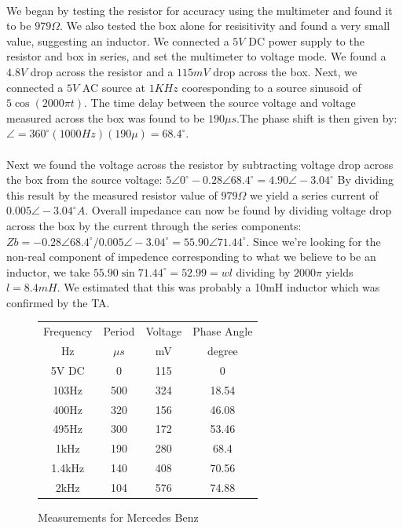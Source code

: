 \documentclass{article}
\begin{document}
\paragraph{}
We began by testing the resistor for accuracy using the multimeter and found
it to be $979\Omega{}$. We also tested the box alone for resisitivity and found
a very small value, suggesting an inductor. We connected a $5V$ DC power supply
to the resistor and box in series, and set the multimeter to voltage mode. We
found a $4.8V$ drop across the resistor and a $115mV$ drop across the box. Next,
we connected a $5V$ AC source at $1KHz$ cooresponding to a source sinusoid of
$5\cos{}(2000\pi{} t)$. The time delay between the source voltage and voltage 
measured across the box was found to be $190\mu{} s$.The phase shift is then 
given by: $\angle{} = 360^\circ{}(1000Hz)(190\mu{}) = 68.4^\circ{}$. 

\paragraph{} 
Next we found the voltage across the resistor by subtracting voltage drop across
the box from the source voltage:
$5\angle{}0^\circ{} - 0.28\angle{}68.4^\circ{} = 4.90\angle{}-3.04^\circ{}$ By
dividing this result by the measured resistor value of $979\Omega$ we yield a 
series current of $0.005\angle{}-3.04^\circ{}A$. Overall impedance can now be 
found by dividing voltage drop across the box by the current through the series
components: 
$Zb= -0.28\angle{}68.4^\circ{} / 0.005\angle{}-3.04^\circ{} = 55.90\angle{}71.44^\circ{}$.
Since we're looking for the non-real component of impedence corresponding to what 
we believe to be an inductor, we take $55.90\sin{}71.44^\circ{} = 52.99 = wl$ 
dividing by $2000\pi{}$ yields $l=8.4mH$. We estimated that this was probably
a 10mH inductor which was confirmed by the TA.   


\begin{figure}[!h]
\caption{Measurements for Mercedes Benz}
\begin{center}
\begin{tabular}{|c|c|c|c|}
\hline
Frequency & Period & Voltage & Phase Angle\\
Hz & $\mu{}s$ & mV & degree\\
\hline
5V DC & 0 & 115 & 0\\
\hline
103Hz & 500 & 324 & 18.54\\
\hline
400Hz & 320 & 156 & 46.08\\
\hline
495Hz & 300 & 172 & 53.46\\
\hline
1kHz & 190 & 280 & 68.4\\
\hline
1.4kHz & 140 & 408 & 70.56\\
\hline
2kHz & 104 & 576 & 74.88\\
\hline
\end{tabular}
\end{center}
\end{figure}
\end{document}
